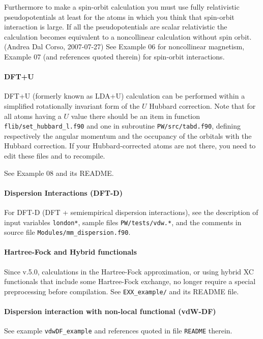 \documentclass[12pt,a4paper]{article}
\begin{document}
Furthermore to make a spin-orbit calculation you must use fully
relativistic pseudopotentials at least for the atoms in which you
think that spin-orbit interaction is large. If all the pseudopotentials 
are scalar
relativistic the calculation becomes equivalent to a noncollinear
calculation without spin orbit. (Andrea Dal Corso, 2007-07-27)
See Example 06 for noncollinear magnetism, Example 07 (and references
quoted therein) for spin-orbit interactions.

\paragraph{DFT+U}
DFT+U (formerly known as LDA+U) calculation can be
performed within a simplified rotationally invariant form 
of the $U$ Hubbard correction. Note that for all atoms having 
a $U$ value there should be an item in function
\texttt{flib/set\_hubbard\_l.f90} and one in 
subroutine \texttt{PW/src/tabd.f90}, defining respectively
the angular momentum and the occupancy of the orbitals with
the Hubbard correction. If your Hubbard-corrected atoms are not
there, you need to edit these files and to recompile.

See Example 08 and its README.

\paragraph{Dispersion Interactions (DFT-D)}
For DFT-D (DFT + semiempirical dispersion interactions), see the
description of input variables \texttt{london*}, sample files
\texttt{PW/tests/vdw.*}, and the comments in source file
\texttt{Modules/mm\_dispersion.f90}.

\paragraph{Hartree-Fock and Hybrid functionals}

Since v.5.0, calculations in the Hartree-Fock approximation, or using 
hybrid XC functionals that include some Hartree-Fock exchange, no longer
require a special preprocessing before compilation.
See \texttt{EXX\_example/} and its README file.

\paragraph{Dispersion interaction with non-local functional (vdW-DF)}
See example \texttt{vdwDF\_example} 
and references
quoted in file \texttt{README} therein.
\end{document}
